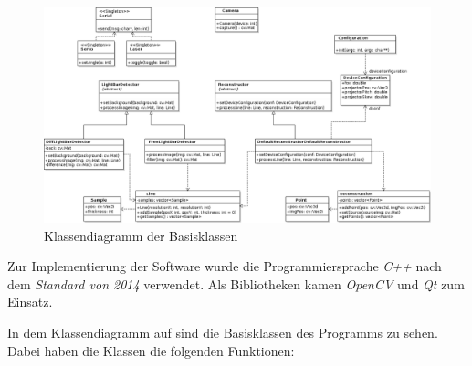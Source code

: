 \documentclass[ngerman,a4paper,parskip=half]{scrartcl}
\begin{document}
\begin{figure}
	\centering
	\includegraphics[width=\linewidth]{includes/classdiagram}
	\caption{Klassendiagramm der Basisklassen}
	\label{fig:classes_base}
\end{figure}

Zur Implementierung der Software wurde die Programmiersprache \emph{C++} nach dem \emph{Standard von 2014} verwendet. Als Bibliotheken kamen \emph{OpenCV} und \emph{Qt} zum Einsatz.

In dem Klassendiagramm auf  sind die Basisklassen des Programms zu sehen. Dabei haben die Klassen die folgenden Funktionen:
\end{document}
